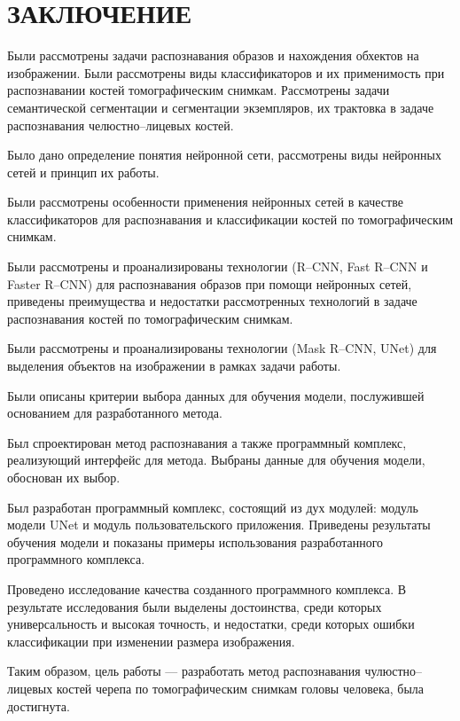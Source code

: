 \section*{ЗАКЛЮЧЕНИЕ}

Были рассмотрены задачи распознавания образов и нахождения обхектов на изображении. Были рассмотрены виды классификаторов и их применимость при распознавании костей томографическим снимкам. Рассмотрены задачи семантической сегментации и сегментации экземпляров, их трактовка в задаче распознавания челюстно--лицевых костей.

Было дано определение понятия нейронной сети, рассмотрены виды нейронных сетей и принцип их работы.

Были рассмотрены особенности применения нейронных сетей в качестве классификаторов для распознавания и классификации костей по томографическим снимкам.

Были рассмотрены и проанализированы технологии (R--CNN, Fast R--CNN и Faster R--CNN) для распознавания образов при помощи нейронных сетей, приведены преимущества и недостатки рассмотренных технологий в задаче распознавания костей по томографическим снимкам.

Были рассмотрены и проанализированы технологии (Mask R--CNN, UNet) для выделения объектов на изображении в рамках задачи работы.

Были описаны критерии выбора данных для обучения модели, послужившей основанием для разработанного метода.

Был спроектирован метод распознавания а также программный комплекс, реализующий интерфейс для метода. Выбраны данные для обучения модели, обоснован их выбор.

Был разработан программный комплекс, состоящий из дух модулей: модуль модели UNet и модуль пользовательского приложения. Приведены результаты обучения модели и показаны примеры использования разработанного программного комплекса.

Проведено исследование качества созданного программного комплекса. В результате исследования были выделены достоинства, среди которых универсальность и высокая точность, и недостатки, среди которых ошибки классификации при изменении размера изображения.

Таким образом, цель работы --- разработать метод распознавания чулюстно--лицевых костей черепа по томографическим снимкам головы человека, была достигнута.